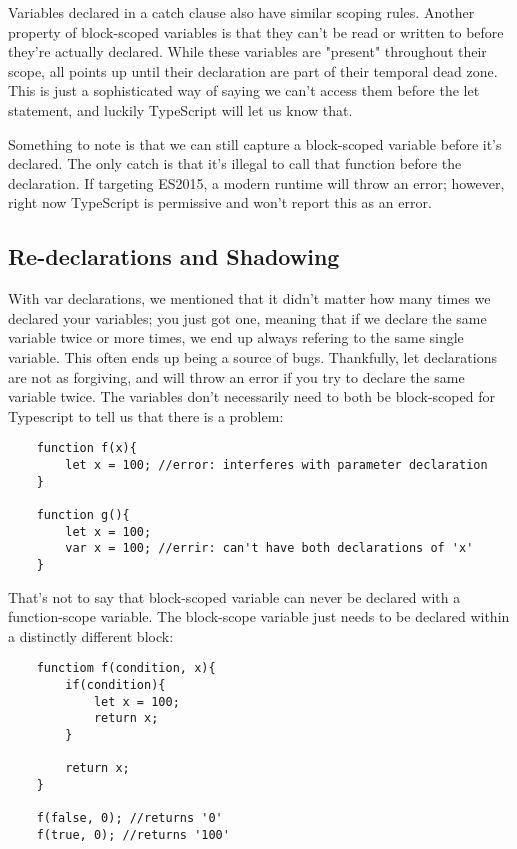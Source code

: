 Variables declared in a catch clause also have similar scoping rules. Another property of block-scoped variables is that they can't be read or written to before they're actually declared. While these variables are "present" throughout their scope, all points up until their declaration are part of their temporal dead zone. This is just a sophisticated way of saying we can't access them before the let statement, and luckily TypeScript will let us know that.

Something to note is that we can still capture a block-scoped variable before it's declared. The only catch is that it's illegal to call that function before the declaration. If targeting ES2015, a modern runtime will throw an error; however, right now TypeScript is permissive and won't report this as an error.

\subsection{Re-declarations and Shadowing}
With var declarations, we mentioned that it didn't matter how many times we declared your variables; you just got one, meaning that if we declare the same variable twice or more times, we end up always refering to the same single variable. This often ends up being a source of bugs. Thankfully, let declarations are not as forgiving, and will throw an error if you try to declare the same variable twice. The variables don't necessarily need to both be block-scoped for Typescript to tell us that there is a problem:

\begin{lstlisting}
    function f(x){
        let x = 100; //error: interferes with parameter declaration
    }

    function g(){
        let x = 100;
        var x = 100; //errir: can't have both declarations of 'x'
    }
\end{lstlisting}

That's not to say that block-scoped variable can never be declared with a function-scope variable. The block-scope variable just needs to be declared within a distinctly different block:

\begin{lstlisting}
    functiom f(condition, x){
        if(condition){
            let x = 100;
            return x;
        }

        return x;
    }

    f(false, 0); //returns '0'
    f(true, 0); //returns '100'
\end{lstlisting}

